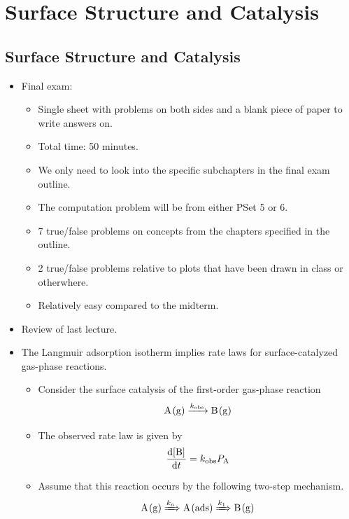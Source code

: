 \documentclass[../notes.tex]{subfiles}
\begin{document}
\chapter{Surface Structure and Catalysis}
\section{Surface Structure and Catalysis}
\begin{itemize}
    \item {}Final exam:
    \begin{itemize}
        \item Single sheet with problems on both sides and a blank piece of paper to write answers on.
        \item Total time: 50 minutes.
        \item We only need to look into the specific subchapters in the final exam outline.
        \item The computation problem will be from either PSet 5 or 6.
        \item 7 true/false problems on concepts from the chapters specified in the outline.
        \item 2 true/false problems relative to plots that have been drawn in class or otherwhere.
        \item Relatively easy compared to the midterm.
    \end{itemize}
    \item Review of last lecture.
    \item The Langmuir adsorption isotherm implies rate laws for surface-catalyzed gas-phase reactions.
    \begin{itemize}
        \item Consider the surface catalysis of the first-order gas-phase reaction
        \begin{equation*}
            \ce{A(g) ->[$k_\text{obs}$] B(g)}
        \end{equation*}
        \item The observed rate law is given by
        \begin{equation*}
            \dv{\cnc{B}}{t} = k_\text{obs}P_{\ce{A}}
        \end{equation*}
        \item Assume that this reaction occurs by the following two-step mechanism.
        \begin{equation*}
            \ce{A(g)} \xRightarrow{k_a} \ce{A(ads)} \xRightarrow{k_1} \ce{B(g)}

\end{equation*}
\end{itemize}
\end{itemize}
\end{document}
